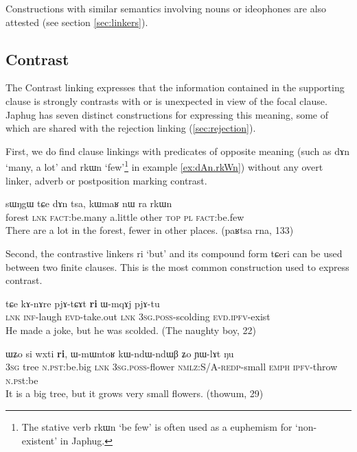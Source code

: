 \documentclass[oldfontcommands,oneside,a4paper,11pt]{article}
\newcommand{\ipa}[1]{{\phon \mbox{#1}}} %
\begin{document}
Constructions with similar semantics involving nouns or ideophones are also attested (see section \ref{sec:linkers}).
 
 
 
 
\subsection{Contrast} \label{sec:contrast}
The Contrast linking expresses that the information contained in the supporting clause is strongly contrasts with or is unexpected in view of the focal clause. Japhug has seven distinct constructions for expressing this meaning, some of which are shared with the rejection linking (\ref{sec:rejection}).

First, we do find  clause linkings with predicates of opposite meaning (such as \ipa{dɤn} `many, a lot' and \ipa{rkɯn} `few'\footnote{The stative verb \ipa{rkɯn} `be few' is often used as a euphemism for `non-existent' in Japhug.} in example \ref{ex:dAn.rkWn}) without any overt linker, adverb or postposition marking contrast.
\begin{exe}
\ex \label{ex:dAn.rkWn}
\gll
 \ipa{sɯŋgɯ}  	\ipa{tɕe}  	\ipa{dɤn}  	\ipa{tsa,}  	\ipa{kɯmaʁ}  	\ipa{nɯ} \ipa{ra}  	\ipa{rkɯn}  \\
 forest \textsc{lnk} \textsc{fact}:be.many a.little other \textsc{top} \textsc{pl} \textsc{fact}:be.few \\
\glt There are a lot in the forest, fewer in other places. (paʁtsa rna, 133)
\end{exe}

Second, the contrastive linkers \ipa{ri} `but' and its compound form \ipa{tɕeri} can be used between two finite clauses. This is the most common construction used to express contrast.
\begin{exe}
\ex \label{ex:ndAre.mWjmWm}
\gll
\ipa{tɕe}  	\ipa{kɤ-nɤre}  	\ipa{pjɤ-tɕɤt}  	\ipa{\textbf{ri}}  	\ipa{ɯ-mqɤj}  	\ipa{pjɤ-tu}  \\
\textsc{lnk} \textsc{inf}-laugh \textsc{evd}-take.out \textsc{lnk} \textsc{3sg.poss}-scolding
\textsc{evd.ipfv}-exist\\
\glt He made a joke, but he was scolded. (The naughty boy, 22)
\end{exe}

\begin{exe}
\ex \label{ex:wxti.ri}
\gll
\ipa{ɯʑo}    	\ipa{si}    	\ipa{wxti}    	\ipa{\textbf{ri},}    	\ipa{ɯ-mɯntoʁ}    	\ipa{kɯ-ndɯ-ndɯβ}    	\ipa{ʑo}    	\ipa{ɲɯ-lɤt}    	\ipa{ŋu}    \\
\textsc{3sg} tree \textsc{n.pst:}be.big \textsc{lnk} \textsc{3sg.poss}-flower \textsc{nmlz}:S/A-\textsc{redp}-small \textsc{emph} \textsc{ipfv}-throw \textsc{n.ps}t:be\\
\glt It is a big tree, but it grows very small flowers. (thowum, 29)
\end{exe}
\end{document}

